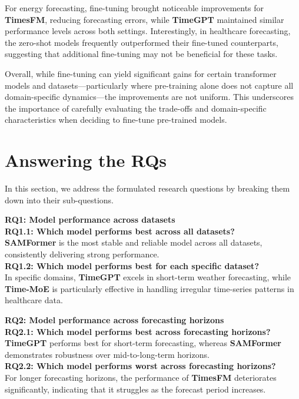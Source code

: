 For energy forecasting, fine-tuning brought noticeable improvements for \textbf{TimesFM}, reducing forecasting errors, while \textbf{TimeGPT} maintained similar performance levels across both settings. Interestingly, in healthcare forecasting, the zero-shot models frequently outperformed their fine-tuned counterparts, suggesting that additional fine-tuning may not be beneficial for these tasks.

Overall, while fine-tuning can yield significant gains for certain transformer models and datasets—particularly where pre-training alone does not capture all domain-specific dynamics—the improvements are not uniform. This underscores the importance of carefully evaluating the trade-offs and domain-specific characteristics when deciding to fine-tune pre-trained models.

\section{Answering the RQs}

In this section, we address the formulated research questions by breaking them down into their sub-questions.

\textbf{RQ1: Model performance across datasets} \\[1mm]
\textbf{RQ1.1: Which model performs best across all datasets?}\\
\noindent \textbf{SAMFormer} is the most stable and reliable model across all datasets, consistently delivering strong performance.\\[2mm]
\textbf{RQ1.2: Which model performs best for each specific dataset?}\\
\noindent In specific domains, \textbf{TimeGPT} excels in short-term weather forecasting, while \textbf{Time-MoE} is particularly effective in handling irregular time-series patterns in healthcare data.

\vspace{2mm}
\textbf{RQ2: Model performance across forecasting horizons} \\[1mm]
\textbf{RQ2.1: Which model performs best across forecasting horizons?}\\
\noindent \textbf{TimeGPT} performs best for short-term forecasting, whereas \textbf{SAMFormer} demonstrates robustness over mid-to-long-term horizons.\\[2mm]
\textbf{RQ2.2: Which model performs worst across forecasting horizons?}\\
\noindent For longer forecasting horizons, the performance of \textbf{TimesFM} deteriorates significantly, indicating that it struggles as the forecast period increases.

